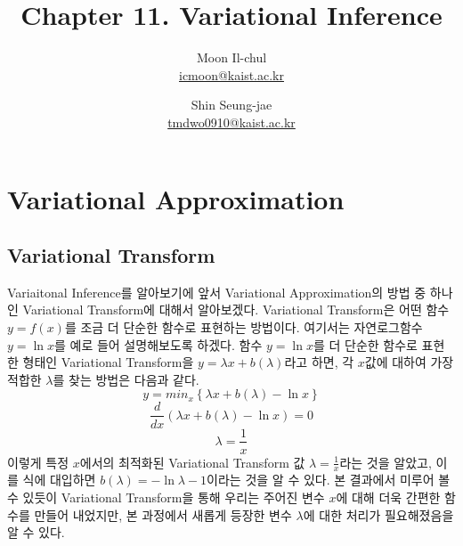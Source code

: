 \documentclass[draft=false]{oblivoir}
\author{Moon Il-chul \\ \href{mailto:icmoon@kaist.ac.kr}{icmoon@kaist.ac.kr} 
   \and Shin Seung-jae \\ \href{mailto:tmdwo0910@kaist.ac.kr}{tmdwo0910@kaist.ac.kr} }
\title{Chapter 11. Variational Inference}
\begin{document}
\maketitle

\tableofcontents


\newpage

\section{Variational Approximation}

\subsection{Variational Transform}
Variaitonal Inference를 알아보기에 앞서 Variational Approximation의 방법 중 하나인 Variational Transform에 대해서 알아보겠다. Variational Transform은 어떤 함수 $y=f(x)$를 조금 더 단순한 함수로 표현하는 방법이다.
여기서는 자연로그함수 $y =\ln x$를 예로 들어 설명해보도록 하겠다. 함수 $y = \ln x$를 더 단순한 함수로 표현한 형태인 Variational Transform을 $y = \lambda x + b(\lambda)$라고 하면, 각 $x$값에 대하여 가장 적합한 $\lambda$를 찾는 방법은 다음과 같다.
\begin{equation}
y = min_{x} \left\{ \lambda x + b(\lambda) - \ln x \right\}
\label{eq:11-2-1}
\end{equation}
\begin{equation}
{\frac{d}{dx}}(\lambda x +b(\lambda) -\ln x )=0
\label{eq:11-2-2-1}
\end{equation}
\begin{equation}
\lambda = \frac{1}{x}
\label{eq:11-2-3-1}
\end{equation}
이렇게 특정 $x$에서의 최적화된 Variational Transform 값 $ \lambda = \frac{1}{x}$라는 것을 알았고, 이를 식에 대입하면 $b(\lambda) = -\ln \lambda -1$이라는 것을 알 수 있다. 본 결과에서 미루어 볼 수 있듯이 Variational Transform을 통해 우리는 주어진 변수 $x$에 대해 더욱 간편한 함수를 만들어 내었지만, 본 과정에서 새롭게 등장한 변수 $\lambda$에 대한 처리가 필요해졌음을 알 수 있다.
\end{document}
